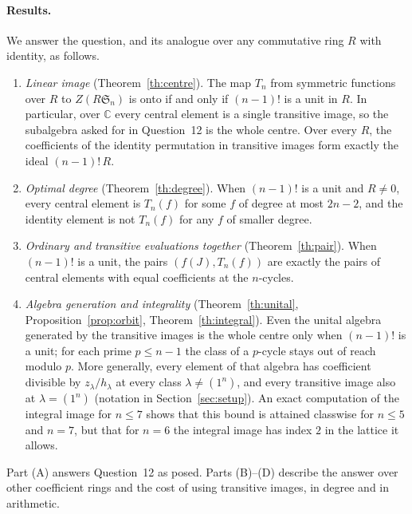 \documentclass[11pt,a4paper]{article}
\theoremstyle{definition}
\newcommand{\Sn}{\mathfrak S}
\newcommand{\C}{\mathbb C}
\begin{document}
\paragraph{Results.} We answer the question, and its analogue over any commutative ring $R$ with identity, as follows.
\begin{enumerate}[label=(\Alph*),leftmargin=2.2em]
\item \emph{Linear image} (Theorem~\ref{th:centre}). The map $T_n$ from symmetric functions over $R$ to $Z(R\Sn_n)$ is onto if and only if $(n-1)!$ is a unit in $R$. In particular, over $\C$ every central element is a single transitive image, so the subalgebra asked for in Question~12 is the whole centre. Over every $R$, the coefficients of the identity permutation in transitive images form exactly the ideal $(n-1)!\,R$.
\item \emph{Optimal degree} (Theorem~\ref{th:degree}). When $(n-1)!$ is a unit and $R\ne0$, every central element is $T_n(f)$ for some $f$ of degree at most $2n-2$, and the identity element is not $T_n(f)$ for any $f$ of smaller degree.
\item \emph{Ordinary and transitive evaluations together} (Theorem~\ref{th:pair}). When $(n-1)!$ is a unit, the pairs $(f(J),T_n(f))$ are exactly the pairs of central elements with equal coefficients at the $n$-cycles.
\item \emph{Algebra generation and integrality} (Theorem~\ref{th:unital}, Proposition~\ref{prop:orbit}, Theorem~\ref{th:integral}). Even the unital algebra generated by the transitive images is the whole centre only when $(n-1)!$ is a unit; for each prime $p\le n-1$ the class of a $p$-cycle stays out of reach modulo $p$. More generally, every element of that algebra has coefficient divisible by $z_\lambda/h_\lambda$ at every class $\lambda\ne(1^n)$, and every transitive image also at $\lambda=(1^n)$ (notation in Section~\ref{sec:setup}). An exact computation of the integral image for $n\le7$ shows that this bound is attained classwise for $n\le5$ and $n=7$, but that for $n=6$ the integral image has index $2$ in the lattice it allows.
\end{enumerate}
Part (A) answers Question~12 as posed. Parts (B)--(D) describe the answer over other coefficient rings and the cost of using transitive images, in degree and in arithmetic.
\end{document}
